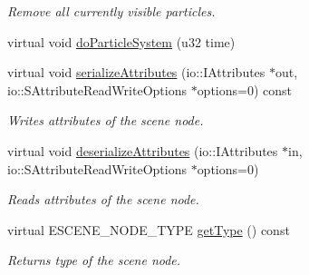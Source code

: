 \begin{DoxyCompactItemize}
\begin{DoxyCompactList}\small\item\em Remove all currently visible particles. \end{DoxyCompactList}\item 
virtual void \hyperlink{classirr_1_1scene_1_1_c_particle_system_scene_node_a7864789e0e2afbc8c6438db9764c10f4}{do\-Particle\-System} (u32 time)
\item 
\hypertarget{classirr_1_1scene_1_1_c_particle_system_scene_node_acba8da24504fa177388bf9c2857c21ad}{virtual void \hyperlink{classirr_1_1scene_1_1_c_particle_system_scene_node_acba8da24504fa177388bf9c2857c21ad}{serialize\-Attributes} (io\-::\-I\-Attributes $\ast$out, io\-::\-S\-Attribute\-Read\-Write\-Options $\ast$options=0) const }\label{classirr_1_1scene_1_1_c_particle_system_scene_node_acba8da24504fa177388bf9c2857c21ad}

\begin{DoxyCompactList}\small\item\em Writes attributes of the scene node. \end{DoxyCompactList}\item 
\hypertarget{classirr_1_1scene_1_1_c_particle_system_scene_node_accfa4498e355d5f34fbb28566e0f4663}{virtual void \hyperlink{classirr_1_1scene_1_1_c_particle_system_scene_node_accfa4498e355d5f34fbb28566e0f4663}{deserialize\-Attributes} (io\-::\-I\-Attributes $\ast$in, io\-::\-S\-Attribute\-Read\-Write\-Options $\ast$options=0)}\label{classirr_1_1scene_1_1_c_particle_system_scene_node_accfa4498e355d5f34fbb28566e0f4663}

\begin{DoxyCompactList}\small\item\em Reads attributes of the scene node. \end{DoxyCompactList}\item 
\hypertarget{classirr_1_1scene_1_1_c_particle_system_scene_node_a08629faa392c46e79bba844b64381f01}{virtual E\-S\-C\-E\-N\-E\-\_\-\-N\-O\-D\-E\-\_\-\-T\-Y\-P\-E \hyperlink{classirr_1_1scene_1_1_c_particle_system_scene_node_a08629faa392c46e79bba844b64381f01}{get\-Type} () const }\label{classirr_1_1scene_1_1_c_particle_system_scene_node_a08629faa392c46e79bba844b64381f01}

\begin{DoxyCompactList}\small\item\em Returns type of the scene node. \end{DoxyCompactList}\end{DoxyCompactItemize}


